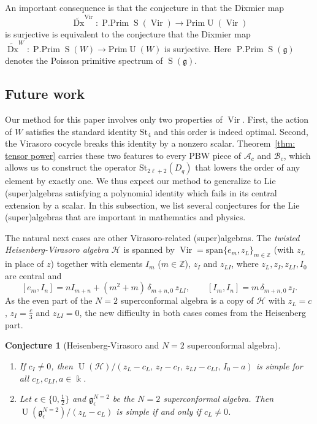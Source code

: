 \documentclass[12pt]{amsart}
\theoremstyle{plain}
\newtheorem{conjecture}[theorem]{Conjecture}
\theoremstyle{definition}
\numberwithin{equation}{theorem}
\newcommand{\kk}{\Bbbk}
\newcommand{\Vir}{\operatorname{Vir}}
\newcommand{\Sa}{\operatorname{S}}
\newcommand{\UU}{\operatorname{U}}
\newcommand{\ZZ}{\mathbb{Z}}
\newcommand{\Dx}{\operatorname{Dx}}
\newcommand{\Pprim}{\operatorname{P.Prim}}
\newcommand{\mc}[1]{\mathcal{#1}}
\newcommand{\g}{\mathfrak{g}}
\newcommand{\St}{\mathrm{St}}
\newcommand{\Prim}{\mathrm{Prim}}
\newcommand{\Span}{\mathrm{span}}
\begin{document}
An important consequence is that the conjecture in \cite[Conjecture 8.6]{pham2025orbit} that the Dixmier map 
\[\widetilde{\Dx}^{\Vir}: \Pprim \Sa(\Vir) \to \Prim \UU(\Vir)\]
is surjective is equivalent to the conjecture that the Dixmier map $\widetilde{\Dx}^{W}: \Pprim \Sa(W) \to \Prim \UU(W)$ is surjective. Here $\Pprim \Sa(\g)$ denotes the Poisson primitive spectrum of $\Sa(\g)$. 


\subsection{Future work}\label{subsec: Future work}
Our method for this paper involves only two properties of $\Vir$. First, the action of $W$ satisfies the standard identity $\St_4$ and this order is indeed optimal. Second, the Virasoro cocycle breaks this identity by a nonzero scalar. Theorem~\ref{thm: tensor power} carries these two features to every PBW piece of $\mc{A}_c$ and $\mc{B}_c$, which allows us to construct the operator $\St_{2\ell+2}(D_q)$ that lowers the order of any element by exactly one. We thus expect our method to generalize to Lie (super)algebras satisfying a polynomial identity which fails in its central extension by a scalar. In this subsection, we list several conjectures for the Lie (super)algebras that are important in mathematics and physics.  

The natural next cases are other Virasoro-related (super)algebras. The \emph{twisted Heisenberg-Virasoro algebra} $\mathcal{H}$ is spanned by $\Vir= \Span \{e_m,z_L\}_{m \in \ZZ}$ (with $z_L$ in place of $z$) together with elements $I_m$ ($m\in\ZZ$), $z_I$ and $z_{LI}$, where $z_L,z_I,z_{LI},I_0$ are central and
\[
[e_m,I_n] = nI_{m+n} + (m^2+m)\,\delta_{m+n,0} \, z_{LI}, \qquad 
[I_m,I_n] = m\,\delta_{m+n,0} \, z_I.
\]
As the even part of the $N=2$ superconformal algebra \cite[Example 5.9 c]{Kac98vertex} is a copy of $\mc H$ with $z_L=c$, $z_I=\frac{c}{3}$ and $z_{LI}=0$, the new difficulty in both cases comes from the Heisenberg part. 
\begin{conjecture}[Heisenberg-Virasoro and $N=2$ superconformal algebra]\label{conj: HV-N2}
\leavevmode
\begin{enumerate}
\item If $c_I \neq 0$, then
$\UU(\mc H)/(z_L-c_L,\,z_I-c_I,\,z_{LI}-c_{LI},\,I_0-a)$ is simple for all
$c_L,c_{LI},a\in\kk$.
\item Let $\epsilon \in \{0, \frac{1}{2}\}$ and $\g^{N=2}_\epsilon$ be the $N=2$ superconformal algebra. Then $\UU(\g^{N=2}_\epsilon)/(z_L-c_L)$ is simple if and only if $c_L \neq 0$.
\end{enumerate}
\end{conjecture}
\end{document}
